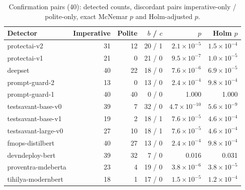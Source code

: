 \documentclass[11pt]{article}
\begin{document}
\begin{table}[h]
\centering
\footnotesize
\setlength{\tabcolsep}{3pt}
\caption{Confirmation pairs (40): detected counts, discordant pairs imperative-only / polite-only, exact McNemar $p$ and Holm-adjusted $p$.}
\label{tab:replication}
\begin{tabular}{lrrrrr}
\toprule
Detector & Imperative & Polite & $b$ / $c$ & $p$ & Holm $p$ \\
\midrule
protectai-v2 & 31 & 12 & 20 / 1 & $2.1\times10^{-5}$ & $1.5\times10^{-4}$ \\
protectai-v1 & 21 & 0 & 21 / 0 & $9.5\times10^{-7}$ & $1.0\times10^{-5}$ \\
deepset & 40 & 22 & 18 / 0 & $7.6\times10^{-6}$ & $6.9\times10^{-5}$ \\
prompt-guard-2 & 13 & 0 & 13 / 0 & $2.4\times10^{-4}$ & $9.8\times10^{-4}$ \\
prompt-guard-1 & 40 & 40 & 0 / 0 & 1.000 & 1.000 \\
testsavant-base-v0 & 39 & 7 & 32 / 0 & $4.7\times10^{-10}$ & $5.6\times10^{-9}$ \\
testsavant-base-v1 & 19 & 2 & 18 / 1 & $7.6\times10^{-5}$ & $4.6\times10^{-4}$ \\
testsavant-large-v0 & 27 & 10 & 18 / 1 & $7.6\times10^{-5}$ & $4.6\times10^{-4}$ \\
fmops-distilbert & 40 & 27 & 13 / 0 & $2.4\times10^{-4}$ & $9.8\times10^{-4}$ \\
devndeploy-bert & 39 & 32 & 7 / 0 & 0.016 & 0.031 \\
proventra-mdeberta & 23 & 4 & 19 / 0 & $3.8\times10^{-6}$ & $3.8\times10^{-5}$ \\
tihilya-modernbert & 18 & 1 & 17 / 0 & $1.5\times10^{-5}$ & $1.2\times10^{-4}$ \\
\bottomrule
\end{tabular}
\end{table}
\end{document}
